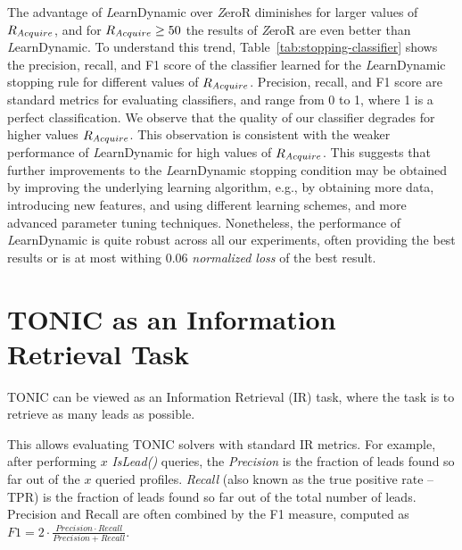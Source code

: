 \documentclass[journal]{IEEEtran}
\newcommand{\learnFixed}{{\textit ZeroR}}
\newcommand{\learnDynamic}{{\textit LearnDynamic}}
\newcommand{\islead}[1]{{\em IsLead(#1)}}
\newcommand{\Acquire}{{\textit Acquire}}
\newcommand{\newstuff}[1]{#1}
\begin{document}
The advantage of \learnDynamic{} over \learnFixed{} diminishes for larger values of $R_{\Acquire{}}$, and for $R_{\Acquire{}} \geq 50$ the results of \learnFixed{} are even better than \learnDynamic{}. 
To understand this trend, Table~\ref{tab:stopping-classifier} shows the precision, recall, and F1 score of the classifier learned for the \learnDynamic{} stopping rule for different values of $R_{\Acquire{}}$. 
Precision, recall, and F1 score are standard metrics for evaluating classifiers, and range from 0 to 1, where 1 is a perfect classification. 
We observe that the quality of our classifier degrades for higher values $R_{\Acquire{}}$. 
This observation is consistent with the weaker performance of \learnDynamic{} for high values of $R_{\Acquire{}}$. 
This suggests that further improvements to the \learnDynamic{} stopping condition may be obtained by improving the underlying learning algorithm, e.g., by obtaining more data, introducing new features, and using different learning schemes, and more advanced parameter tuning techniques. Nonetheless, the performance of \learnDynamic{} is quite robust across all our experiments, often providing the best results or is at most withing 0.06 \emph{normalized loss}  of the best result. 



\section{TONIC as an Information Retrieval Task}
\label{sec:ir}


TONIC can be viewed as an Information Retrieval (IR) task, where the task is to retrieve as many leads as possible. %
\newstuff{
This allows evaluating TONIC solvers 
with standard IR metrics. For example, after performing $x$ \islead{} queries, 
the {\em Precision} is the fraction of leads found so far 
out of the \(x\) queried profiles. {\em Recall} (also known as the true positive rate -- TPR) 
is the fraction of leads found so far out of the total number of leads. 
Precision and Recall are often combined by the F1 measure, computed as 
$F1=2\cdot \frac{Precision\cdot Recall}{Precision+Recall}$.}
\end{document}
